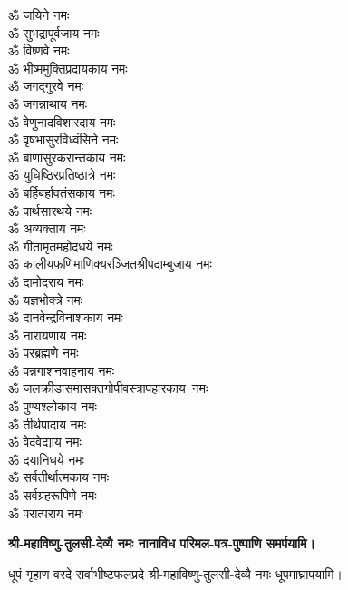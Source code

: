 \begin{multicols}{2}
\begin{flushleft}
ॐ जयिने नमः\hfill{}\\
ॐ सुभद्रापूर्वजाय नमः\\
ॐ विष्णवे नमः\\
ॐ भीष्ममुक्तिप्रदायकाय नमः\\
ॐ जगद्गुरवे नमः\\
ॐ जगन्नाथाय नमः\\
ॐ वेणुनादविशारदाय नमः\\
ॐ वृषभासुरविध्वंसिने नमः\\
ॐ बाणासुरकरान्तकाय नमः\\
ॐ युधिष्ठिरप्रतिष्ठात्रे नमः\\
ॐ बर्हिबर्हावतंसकाय नमः\hfill{}\\
ॐ पार्थसारथये नमः\\
ॐ अव्यक्ताय नमः\\
ॐ गीतामृतमहोदधये नमः\\
ॐ कालीयफणिमाणिक्य\-रञ्जित\-श्री\-पदाम्बुजाय नमः\\
ॐ दामोदराय नमः\\
ॐ यज्ञभोक्त्रे नमः\\
ॐ दानवेन्द्रविनाशकाय नमः\\
ॐ नारायणाय नमः\\
ॐ परब्रह्मणे नमः\\
ॐ पन्नगाशनवाहनाय नमः\hfill{}\\
ॐ जलक्रीडासमासक्त\-गोपी\-वस्त्रापहारकाय~नमः\\
ॐ पुण्यश्लोकाय नमः\\
ॐ तीर्थपादाय नमः\\
ॐ वेदवेद्याय नमः\\
ॐ दयानिधये नमः\\
ॐ सर्वतीर्थात्मकाय नमः\\
ॐ सर्वग्रहरूपिणे नमः\\
ॐ परात्पराय नमः\hfill{}\\
\end{flushleft}
\end{multicols}

\begingroup
\centering
\setlength{\columnseprule}{1pt}
\let\chapt\sect


\textbf{श्री-महाविष्णु-तुलसी-देव्यै नमः नानाविध परिमल-पत्र-पुष्पाणि समर्पयामि।}

\endgroup



{धूपं गृहाण वरदे सर्वाभीष्टफलप्रदे}
श्री-महाविष्णु-तुलसी-देव्यै नमः धूपमाघ्रापयामि।\\

